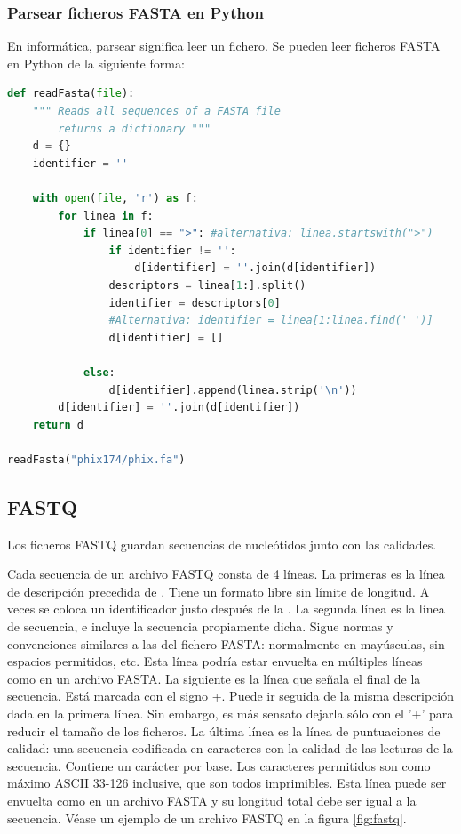 \subsubsection{Parsear ficheros FASTA en Python}
En informática, parsear significa leer un fichero. Se pueden leer ficheros FASTA en Python de la siguiente forma:
\begin{lstlisting}[language=Python]
def readFasta(file):
    """ Reads all sequences of a FASTA file 
        returns a dictionary """  
    d = {}
    identifier = ''
    
    with open(file, 'r') as f:
        for linea in f:
            if linea[0] == ">": #alternativa: linea.startswith(">")
                if identifier != '':
                    d[identifier] = ''.join(d[identifier])
                descriptors = linea[1:].split()
                identifier = descriptors[0]
                #Alternativa: identifier = linea[1:linea.find(' ')]
                d[identifier] = []
                
            else:
                d[identifier].append(linea.strip('\n'))
        d[identifier] = ''.join(d[identifier])
    return d

readFasta("phix174/phix.fa")
\end{lstlisting}

\subsection{FASTQ}
Los ficheros FASTQ guardan secuencias de nucleótidos junto con las calidades.

Cada secuencia de un archivo FASTQ consta de 4 líneas. La primeras es la línea de descripción precedida de \@. Tiene un formato libre sin límite de longitud. A veces se coloca un identificador justo después de la \@. La segunda línea es la línea de secuencia, e incluye la secuencia propiamente dicha. Sigue normas y convenciones similares a las del fichero FASTA: normalmente en mayúsculas, sin espacios permitidos, etc. Esta línea podría estar envuelta en múltiples líneas como en un archivo FASTA. La siguiente es la línea que señala el final de la secuencia. Está marcada con el signo +. Puede ir seguida de la misma descripción dada en la primera línea. Sin embargo, es más sensato dejarla sólo con el '+' para reducir el tamaño de los ficheros. La última línea es la línea de puntuaciones de calidad: una secuencia codificada en caracteres con la calidad de las lecturas de la secuencia. Contiene un carácter por base. Los caracteres permitidos son como máximo ASCII 33-126 inclusive, que son todos imprimibles. Esta línea puede ser envuelta como en un archivo FASTA y su longitud total debe ser igual a la secuencia. Véase un ejemplo de un archivo FASTQ en la figura \ref{fig:fastq}.

